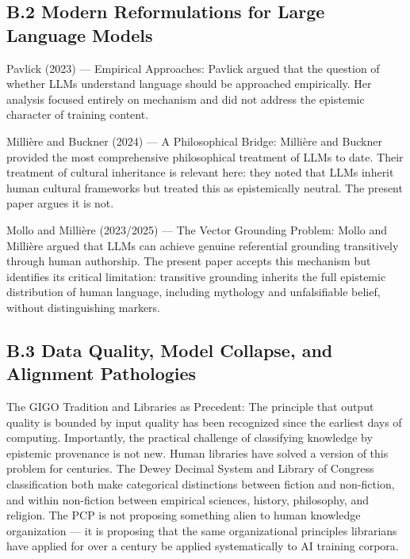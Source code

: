 \documentclass[
]{article}
\begin{document}
\subsection{B.2 Modern Reformulations for Large Language
Models}\label{b.2-modern-reformulations-for-large-language-models}

Pavlick (2023) --- Empirical Approaches: Pavlick argued that the
question of whether LLMs understand language should be approached
empirically. Her analysis focused entirely on mechanism and did not
address the epistemic character of training content.

Millière and Buckner (2024) --- A Philosophical Bridge: Millière and
Buckner provided the most comprehensive philosophical treatment of LLMs
to date. Their treatment of cultural inheritance is relevant here: they
noted that LLMs inherit human cultural frameworks but treated this as
epistemically neutral. The present paper argues it is not.

Mollo and Millière (2023/2025) --- The Vector Grounding Problem: Mollo
and Millière argued that LLMs can achieve genuine referential grounding
transitively through human authorship. The present paper accepts this
mechanism but identifies its critical limitation: transitive grounding
inherits the full epistemic distribution of human language, including
mythology and unfalsifiable belief, without distinguishing markers.

\subsection{B.3 Data Quality, Model Collapse, and Alignment
Pathologies}\label{b.3-data-quality-model-collapse-and-alignment-pathologies}

The GIGO Tradition and Libraries as Precedent: The principle that output
quality is bounded by input quality has been recognized since the
earliest days of computing. Importantly, the practical challenge of
classifying knowledge by epistemic provenance is not new. Human
libraries have solved a version of this problem for centuries. The Dewey
Decimal System and Library of Congress classification both make
categorical distinctions between fiction and non-fiction, and within
non-fiction between empirical sciences, history, philosophy, and
religion. The PCP is not proposing something alien to human knowledge
organization --- it is proposing that the same organizational principles
librarians have applied for over a century be applied systematically to
AI training corpora.
\end{document}
